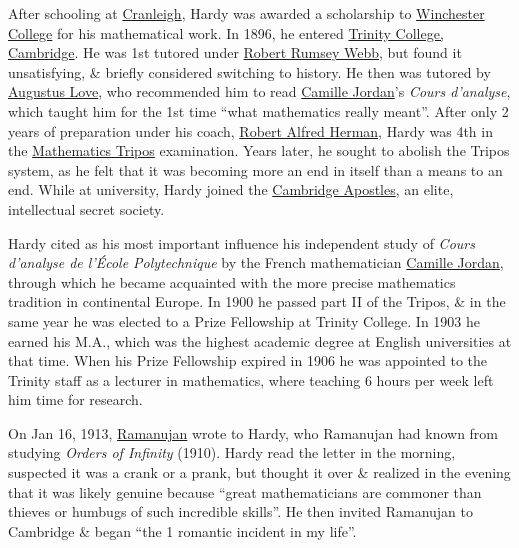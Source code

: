 \documentclass{article}
\begin{document}
After schooling at \href{https://en.wikipedia.org/wiki/Cranleigh_School}{Cranleigh}, {\sc Hardy} was awarded a scholarship to \href{https://en.wikipedia.org/wiki/Winchester_College}{Winchester College} for his mathematical work. In 1896, he entered \href{https://en.wikipedia.org/wiki/Trinity_College,_Cambridge}{Trinity College, Cambridge}. He was 1st tutored under \href{https://en.wikipedia.org/wiki/Robert_Rumsey_Webb}{\sc Robert Rumsey Webb}, but found it unsatisfying, \& briefly considered switching to history. He then was tutored by \href{https://en.wikipedia.org/wiki/Augustus_Edward_Hough_Love}{\sc Augustus Love}, who recommended him to read \href{https://en.wikipedia.org/wiki/Camille_Jordan}{\sc Camille Jordan}'s {\it Cours d'analyse}, which taught him for the 1st time ``what mathematics really meant''. After only 2 years of preparation under his coach, \href{https://en.wikipedia.org/wiki/Robert_Alfred_Herman}{\sc Robert Alfred Herman}, {\sc Hardy} was 4th in the \href{https://en.wikipedia.org/wiki/Cambridge_Mathematical_Tripos}{Mathematics Tripos} examination. Years later, he sought to abolish the Tripos system, as he felt that it was becoming more an end in itself than a means to an end. While at university, {\sc Hardy} joined the \href{https://en.wikipedia.org/wiki/Cambridge_Apostles}{Cambridge Apostles}, an elite, intellectual secret society.

{\sc Hardy} cited as his most important influence his independent study of {\it Cours d'analyse de l'École Polytechnique} by the French mathematician \href{https://en.wikipedia.org/wiki/Camille_Jordan}{\sc Camille Jordan}, through which he became acquainted with the more precise mathematics tradition in continental Europe. In 1900 he passed part II of the Tripos, \& in the same year he was elected to a Prize Fellowship at Trinity College. In 1903 he earned his M.A., which was the highest academic degree at English universities at that time. When his Prize Fellowship expired in 1906 he was appointed to the Trinity staff as a lecturer in mathematics, where teaching 6 hours per week left him time for research.

On Jan 16, 1913, \href{https://en.wikipedia.org/wiki/Srinivasa_Ramanujan}{\sc Ramanujan} wrote to {\sc Hardy}, who Ramanujan had known from studying {\it Orders of Infinity} (1910). {\sc Hardy} read the letter in the morning, suspected it was a crank or a prank, but thought it over \& realized in the evening that it was likely genuine because ``great mathematicians are commoner than thieves or humbugs of such incredible skills''. He then invited {\sc Ramanujan} to Cambridge \& began ``the 1 romantic incident in my life''.
\end{document}
